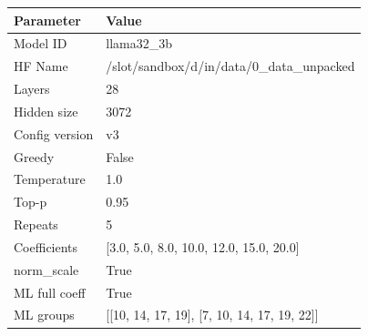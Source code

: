 \begin{tabular}{ll}
\toprule
Parameter & Value \\
\midrule
Model ID & llama32_3b \\
HF Name & /slot/sandbox/d/in/data/0_data_unpacked \\
Layers & 28 \\
Hidden size & 3072 \\
Config version & v3 \\
Greedy & False \\
Temperature & 1.0 \\
Top-p & 0.95 \\
Repeats & 5 \\
Coefficients & [3.0, 5.0, 8.0, 10.0, 12.0, 15.0, 20.0] \\
norm\_scale & True \\
ML full coeff & True \\
ML groups & [[10, 14, 17, 19], [7, 10, 14, 17, 19, 22]] \\
\bottomrule
\end{tabular}
